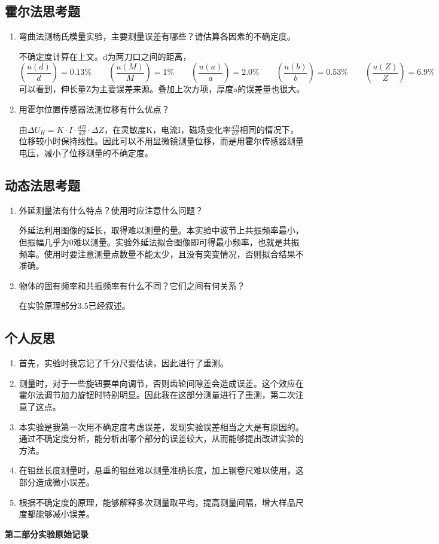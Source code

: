 \documentclass[11pt]{article}
\begin{document}
\subsection{霍尔法思考题}
\begin{enumerate}
    \item 弯曲法测杨氏模量实验，主要测量误差有哪些？请估算各因素的不确定度。
    \par \hspace*{2em}不确定度计算在上文。d为两刀口之间的距离，
    \[\left(\frac{u(d)}{d}\right)=0.13\% \qquad \left(\frac{u(M)}{M}\right)=1\% \qquad\left(\frac{u(a)}{a}\right)=2.0\% \qquad\left(\frac{u(b)}{b}\right)=0.53\% \qquad\left(\frac{u(Z)}{Z}\right)=6.9\%\]
    可以看到，伸长量Z为主要误差来源。叠加上次方项，厚度a的误差量也很大。
    \item 用霍尔位置传感器法测位移有什么优点？
    \par \hspace*{2em}由$\Delta U_H=K\cdot I \cdot \frac{dB}{dZ} \cdot\Delta Z$，在灵敏度K，电流I，磁场变化率$\frac{dB}{dZ}$相同的情况下，位移较小时保持线性。因此可以不用显微镜测量位移，而是用霍尔传感器测量电压，减小了位移测量的不确定度。
\end{enumerate}

\subsection{动态法思考题}
\begin{enumerate}
    \item 外延测量法有什么特点？使用时应注意什么问题？
    \par \hspace*{2em}外延法利用图像的延长，取得难以测量的量。本实验中波节上共振频率最小，但振幅几乎为0难以测量。实验外延法拟合图像即可得最小频率，也就是共振频率。使用时要注意测量点数量不能太少，且没有突变情况，否则拟合结果不准确。
    \item 物体的固有频率和共振频率有什么不同？它们之间有何关系？
    \par \hspace*{2em}在实验原理部分3.5已经叙述。
\end{enumerate}
\subsection{个人反思}
\begin{enumerate}
    \item 首先，实验时我忘记了千分尺要估读，因此进行了重测。
    \item 测量时，对于一些旋钮要单向调节，否则齿轮间隙差会造成误差。这个效应在霍尔法调节加力旋钮时特别明显。因此我在这部分测量进行了重测，第二次注意了这点。
    \item 本实验是我第一次用不确定度考虑误差，发现实验误差相当之大是有原因的。通过不确定度分析，能分析出哪个部分的误差较大，从而能够提出改进实验的方法。
    \item 在钼丝长度测量时，悬垂的钼丝难以测量准确长度，加上钢卷尺难以使用，这部分造成微小误差。
    \item 根据不确定度的原理，能够解释多次测量取平均，提高测量间隔，增大样品尺度都能够减小误差。
\end{enumerate}

\begin{center}
    \vspace*{1em}
    \Large \bf 第二部分\qquad 实验原始记录
\end{center}

\end{document}
